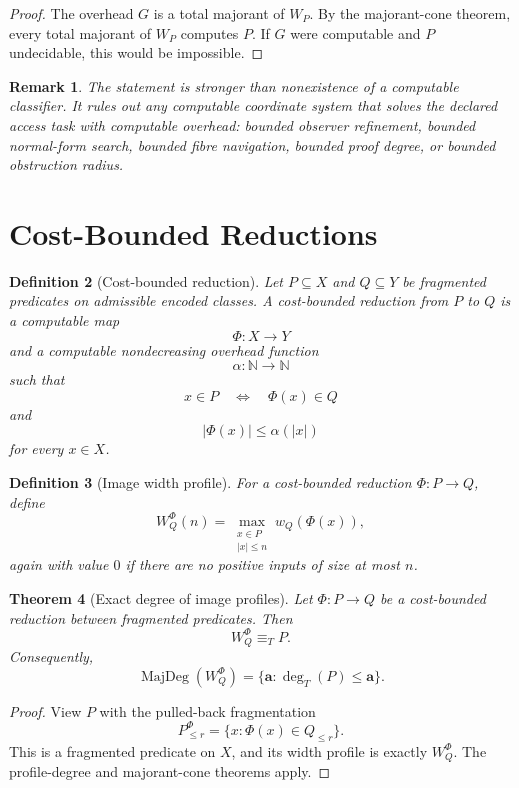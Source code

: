 \documentclass[11pt]{article}
\newtheorem{theorem}{Theorem}[section]
\newtheorem{definition}[theorem]{Definition}
\newtheorem{remark}[theorem]{Remark}
\begin{document}
\begin{proof}
The overhead \(G\) is a total majorant of \(W_P\). By the majorant-cone theorem, every total majorant of \(W_P\) computes \(P\). If \(G\) were computable and \(P\) undecidable, this would be impossible.
\end{proof}

\begin{remark}
The statement is stronger than nonexistence of a computable classifier. It rules out any computable coordinate system that solves the declared access task with computable overhead: bounded observer refinement, bounded normal-form search, bounded fibre navigation, bounded proof degree, or bounded obstruction radius.
\end{remark}

\section{Cost-Bounded Reductions}

\begin{definition}[Cost-bounded reduction]
Let \(P\subseteq X\) and \(Q\subseteq Y\) be fragmented predicates on admissible encoded classes. A cost-bounded reduction from \(P\) to \(Q\) is a computable map
\[
\Phi:X\to Y
\]
and a computable nondecreasing overhead function
\[
\alpha:\mathbb N\to\mathbb N
\]
such that
\[
x\in P
\quad\Longleftrightarrow\quad
\Phi(x)\in Q
\]
and
\[
|\Phi(x)|\le \alpha(|x|)
\]
for every \(x\in X\).
\end{definition}

\begin{definition}[Image width profile]
For a cost-bounded reduction \(\Phi:P\to Q\), define
\[
W_Q^\Phi(n)
=
\max_{\substack{x\in P\\ |x|\le n}}
w_Q(\Phi(x)),
\]
again with value \(0\) if there are no positive inputs of size at most \(n\).
\end{definition}

\begin{theorem}[Exact degree of image profiles]
Let \(\Phi:P\to Q\) be a cost-bounded reduction between fragmented predicates. Then
\[
W_Q^\Phi\equiv_T P.
\]
Consequently,
\[
\operatorname{MajDeg}(W_Q^\Phi)
=
\{\mathbf a:\deg_T(P)\le \mathbf a\}.
\]
\end{theorem}

\begin{proof}
View \(P\) with the pulled-back fragmentation
\[
P_{\le r}^{\Phi}=\{x:\Phi(x)\in Q_{\le r}\}.
\]
This is a fragmented predicate on \(X\), and its width profile is exactly \(W_Q^\Phi\). The profile-degree and majorant-cone theorems apply.
\end{proof}
\end{document}
